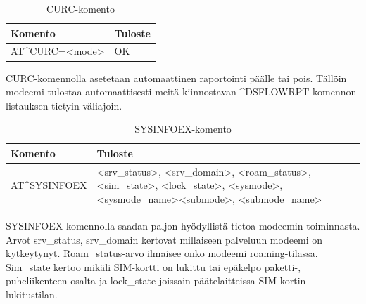 \documentclass[11pt,a4paper,oneside,article,finnish]{memoir}
\begin{document}
\begin{table}[H]
	\centering
	\caption{CURC-komento}
	\begin{tabularx}{.95\textwidth}{|p{3.5cm}|X|}
		\hline
		Komento & Tuloste \\
    		\hline
		AT\^{}CURC=<mode> & OK \\
		\hline
	\end{tabularx}
	\label{table:atkomento_curc}
\end{table}
CURC-komennolla asetetaan automaattinen raportointi päälle tai pois. Tällöin modeemi tulostaa automaattisesti meitä kiinnostavan \^{}DSFLOWRPT-komennon listauksen tietyin väliajoin.
\begin{table}[H]
	\centering
	\caption{SYSINFOEX-komento}
	\begin{tabularx}{.95\textwidth}{|p{3.5cm}|X|}
		\hline
		Komento & Tuloste \\
    		\hline
		AT\^{}SYSINFOEX & \textless srv\_status\textgreater , \textless srv\_domain\textgreater , \textless roam\_status\textgreater , \textless sim\_state\textgreater , \textless lock\_state\textgreater , \textless sysmode\textgreater , \textless sysmode\_name\textgreater \textless submode\textgreater , \textless submode\_name\textgreater \\
		\hline
	\end{tabularx}
	\label{table:atkomento_sysinfoex}
\end{table}
SYSINFOEX-komennolla saadan paljon hyödyllistä tietoa modeemin toiminnasta. Arvot srv\_status, srv\_domain kertovat millaiseen palveluun modeemi on kytkeytynyt. Roam\_status-arvo ilmaisee onko modeemi roaming-tilassa. Sim\_state kertoo mikäli SIM-kortti on lukittu tai epäkelpo paketti-, puheliikenteen osalta ja lock\_state joissain päätelaitteissa SIM-kortin lukitustilan. 
\end{document}
